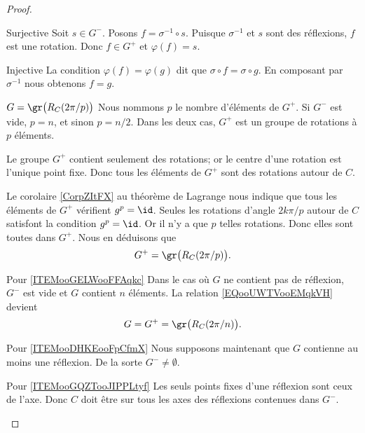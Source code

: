 \begin{proof}
\begin{subproof}
		\begin{subproof}
			\item[Surjective]
			Soit \( s\in G^-\). Posons \( f=\sigma^{-1}\circ s\). Puisque \( \sigma^{-1}\) et \( s\) sont des réflexions, \( f\) est une rotation. Donc \( f\in G^+\) et \( \varphi(f)=s\).
			\item[Injective]
			La condition \( \varphi(f)=\varphi(g)\) dit que \( \sigma\circ f=\sigma\circ g\). En composant par \( \sigma^{-1}\) nous obtenons \( f=g\).
		\end{subproof}
		\item[\( G=\gr\big(R_C(2\pi /p)\big)\)]
		Nous nommons \( p\) le nombre d'éléments de \( G^+\). Si \( G^-\) est vide, \( p=n\), et sinon \( p=n/2\). Dans les deux cas, \( G^+\) est un groupe de rotations à \( p\) éléments.

		Le groupe \( G^+\) contient seulement des rotations; or le centre d'une rotation est l'unique point fixe. Donc tous les éléments de \( G^+\) sont des rotations autour de \( C\).

		Le corolaire \ref{CorpZItFX} au théorème de Lagrange nous indique que tous les éléments de \( G^+\) vérifient \( g^p=\id\). Seules les rotations d'angle \( 2k\pi/p\) autour de \( C\) satisfont la condition \( g^p=\id\). Or il n'y a que \( p\) telles rotations. Donc elles sont toutes dans \( G^+\). Nous en déduisons que
		\begin{equation}        \label{EQooUWTVooEMqkVH}
			G^+=\gr\big( R_C(2\pi/p) \big).
		\end{equation}
		\item[Pour \ref{ITEMooGELWooFFAqkc}]
		Dans le cas où \( G\) ne contient pas de réflexion, \( G^-\) est vide et \( G\) contient \( n\) éléments. La relation \eqref{EQooUWTVooEMqkVH} devient
		\begin{equation}
			G=G^+=\gr\big( R_C(2\pi/n) \big).
		\end{equation}
		\item[Pour \ref{ITEMooDHKEooFpCfmX}]
		Nous supposons maintenant que \( G\) contienne au moins une réflexion. De la sorte \( G^-\neq \emptyset\).
		\begin{subproof}
			\item[Pour \ref{ITEMooGQZTooJIPPLtyf}]
			Les seuls points fixes d'une réflexion sont ceux de l'axe. Donc \( C\) doit être sur tous les axes des réflexions contenues dans \( G^-\).


\end{subproof}
\end{subproof}
\end{proof}
